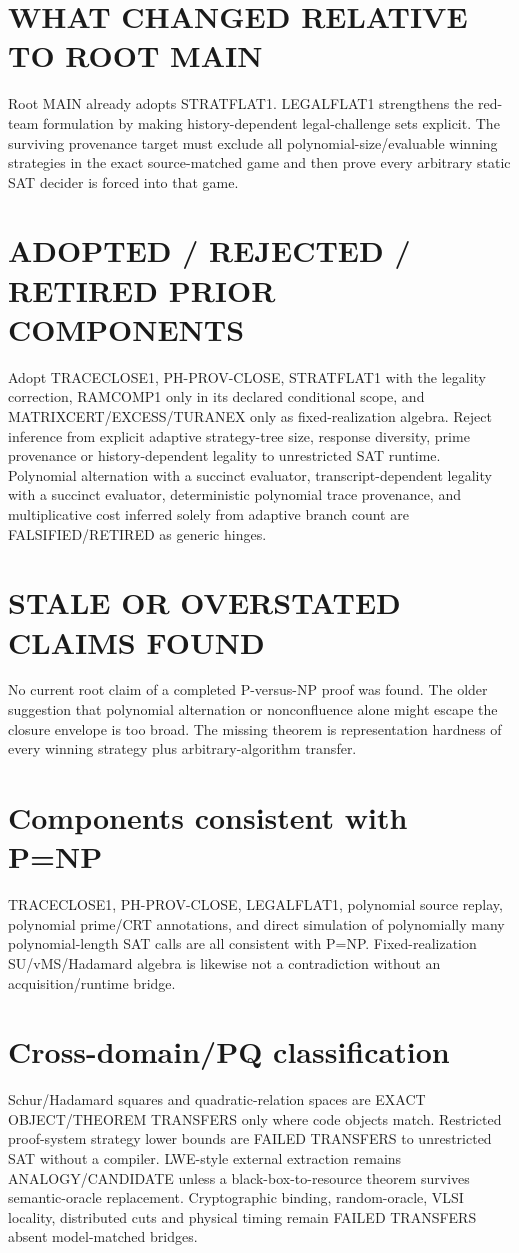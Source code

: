 \documentclass[11pt]{article}
\begin{document}
\section*{WHAT CHANGED RELATIVE TO ROOT MAIN}
Root MAIN already adopts STRATFLAT1. LEGALFLAT1 strengthens the red-team formulation by making history-dependent legal-challenge sets explicit. The surviving provenance target must exclude all polynomial-size/evaluable winning strategies in the exact source-matched game and then prove every arbitrary static SAT decider is forced into that game.

\section*{ADOPTED / REJECTED / RETIRED PRIOR COMPONENTS}
Adopt TRACECLOSE1, PH-PROV-CLOSE, STRATFLAT1 with the legality correction, RAMCOMP1 only in its declared conditional scope, and MATRIXCERT/EXCESS/TURANEX only as fixed-realization algebra. Reject inference from explicit adaptive strategy-tree size, response diversity, prime provenance or history-dependent legality to unrestricted SAT runtime. Polynomial alternation with a succinct evaluator, transcript-dependent legality with a succinct evaluator, deterministic polynomial trace provenance, and multiplicative cost inferred solely from adaptive branch count are FALSIFIED/RETIRED as generic hinges.

\section*{STALE OR OVERSTATED CLAIMS FOUND}
No current root claim of a completed P-versus-NP proof was found. The older suggestion that polynomial alternation or nonconfluence alone might escape the closure envelope is too broad. The missing theorem is representation hardness of every winning strategy plus arbitrary-algorithm transfer.

\section*{Components consistent with P=NP}
TRACECLOSE1, PH-PROV-CLOSE, LEGALFLAT1, polynomial source replay, polynomial prime/CRT annotations, and direct simulation of polynomially many polynomial-length SAT calls are all consistent with P=NP. Fixed-realization SU/vMS/Hadamard algebra is likewise not a contradiction without an acquisition/runtime bridge.

\section*{Cross-domain/PQ classification}
Schur/Hadamard squares and quadratic-relation spaces are EXACT OBJECT/THEOREM TRANSFERS only where code objects match. Restricted proof-system strategy lower bounds are FAILED TRANSFERS to unrestricted SAT without a compiler. LWE-style external extraction remains ANALOGY/CANDIDATE unless a black-box-to-resource theorem survives semantic-oracle replacement. Cryptographic binding, random-oracle, VLSI locality, distributed cuts and physical timing remain FAILED TRANSFERS absent model-matched bridges.
\end{document}
